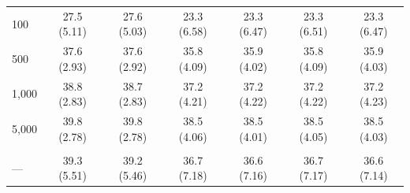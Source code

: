 \documentclass[AMA,STIX1COL,doublespace]{WileyNJD-v2}
\begin{document}
\begin{table}
\begin{tabular}[t]{lcccccc}
\hline
\hspace{1em}100 & 27.5 (5.11) & 27.6 (5.03) & 23.3 (6.58) & 23.3 (6.47) & 23.3 (6.51) & 23.3 (6.47)\\
\hspace{1em}500 & 37.6 (2.93) & 37.6 (2.92) & 35.8 (4.09) & 35.9 (4.02) & 35.8 (4.09) & 35.9 (4.03)\\
\hspace{1em}1,000 & 38.8 (2.83) & 38.7 (2.83) & 37.2 (4.21) & 37.2 (4.22) & 37.2 (4.22) & 37.2 (4.23)\\
\hspace{1em}5,000 & 39.8 (2.78) & 39.8 (2.78) & 38.5 (4.06) & 38.5 (4.01) & 38.5 (4.05) & 38.5 (4.03)\\
\addlinespace[0.75em]
\multicolumn{7}{l}{\textbf{Overall}}\\
\hline
\hspace{1em}--- & 39.3 (5.51) & 39.2 (5.46) & 36.7 (7.18) & 36.6 (7.16) & 36.7 (7.17) & 36.6 (7.14)\\
\bottomrule
\end{tabular}
\end{table}
\end{document}
